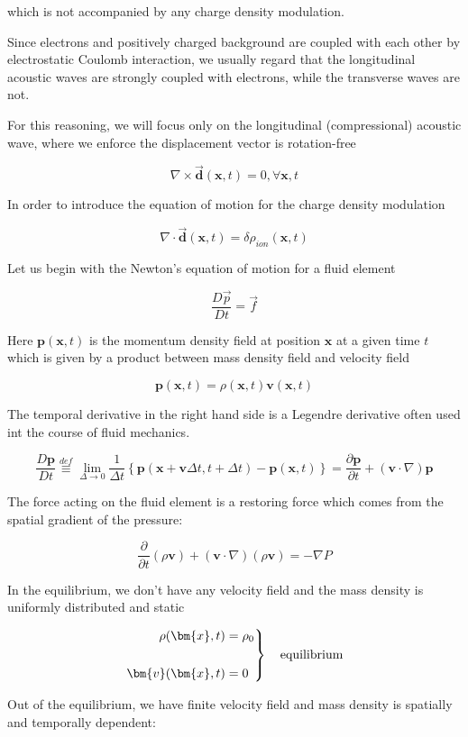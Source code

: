 which is not accompanied by any charge density modulation.

Since electrons and positively charged background are coupled with each other by electrostatic Coulomb interaction, we usually regard that the longitudinal acoustic waves are strongly coupled with electrons, while the transverse waves are not.

For this reasoning, we will focus only on the longitudinal (compressional) acoustic wave, where we enforce the displacement vector is rotation-free

\[\nabla\times\vec{\bm{d}}(\bm{x},t) = 0,\forall\bm{x},t \]

In order to introduce the equation of motion for the charge density modulation

\[\nabla\cdot\vec{\bm{d}}(\bm{x},t) = \delta\rho_{ion}(\bm{x},t) \]

Let us begin with the Newton's equation of motion for a fluid element

\[\frac{D\vec{p}}{Dt} = \vec{f} \]

Here $\bm{p}(\bm{x},t)$ is the momentum density field at position $\bm{x}$ at a given time $t$ which is given by a product between mass density field and velocity field

\[\bm{p}(\bm{x},t) = \rho(\bm{x},t)\bm{v}(\bm{x},t) \]

The temporal derivative in the right hand side is a Legendre derivative often used int the course of fluid mechanics.

\[\frac{D\bm{p}}{Dt} \overset{def}{\equiv}\lim_{\Delta\rightarrow0}\frac{1}{\Delta t} \left\{\bm{p}(\bm{x}+\bm{v}\Delta t,t+\Delta t) - \bm{p}(\bm{x},t)\right\} = \frac{\partial\bm{p}}{\partial t}+(\bm{v}\cdot\nabla)\bm{p} \]

The force acting on the fluid element is a restoring force which comes from the spatial gradient of the pressure:

\[\frac{\partial}{\partial t}(\rho\bm{v})+(\bm{v}\cdot\nabla)(\rho\bm{v}) = -\nabla P \]

In the equilibrium, we don't have any velocity field and the mass density is uniformly distributed and static

\[\left.\begin{split}
\rho(\bm{x},t) &= \rho_0\\
\ & \ \\
\bm{v}(\bm{x},t) &= 0
\end{split}\right\}\text{\quad equilibrium} \]

Out of the equilibrium, we have finite velocity field and mass density is spatially and temporally dependent:


